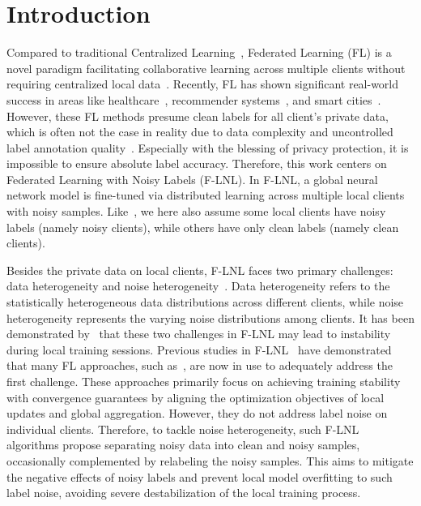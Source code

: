 \documentclass[letterpaper]{article} %
\begin{document}
\section{Introduction}
 
Compared to traditional Centralized Learning~\cite{li2019relation, li2021cross, li2019semi, wu2019mutual, wu2019enhancing, huang2023divide}, Federated Learning (FL) is a novel paradigm facilitating collaborative learning across multiple clients without requiring centralized local data~\cite{FedAvg}. Recently, FL has shown significant real-world success in areas like healthcare~\cite{healthcare1}, recommender systems~\cite{recommendation1}, and smart cities~\cite{smartcity1}. However, these FL methods presume clean labels for all client's private data, which is often not the case in reality due to data complexity and uncontrolled label annotation quality~\cite{tanno2019learning, kuznetsova2020open}. Especially with the blessing of privacy protection, it is impossible to ensure absolute label accuracy. Therefore, this work centers on Federated Learning with Noisy Labels (F-LNL). In F-LNL, a global neural network model is fine-tuned via distributed learning across multiple local clients with noisy samples. Like~\cite{xu2022fedcorr},  we here also assume some local clients have noisy labels (namely noisy clients), while others have only clean labels (namely clean clients).
 
Besides the private data on local clients, F-LNL faces two primary challenges: data heterogeneity and noise heterogeneity~\cite{kim2022fedrn,RoFL}. Data heterogeneity refers to the statistically heterogeneous data distributions across different clients, while noise heterogeneity represents the varying noise distributions among clients. It has been demonstrated by~\cite{xu2022fedcorr,kim2022fedrn} that these two challenges in F-LNL may lead to instability during local training sessions. 
Previous studies in F-LNL~\cite{xu2022fedcorr,kim2022fedrn} have demonstrated that many FL approaches, such as~\cite{FedAvg, FedProx}, are now in use to adequately address the first challenge. These approaches primarily focus on achieving training stability with convergence guarantees by aligning the optimization objectives of local updates and global aggregation. However, they do not address label noise on individual clients. Therefore, to tackle noise heterogeneity, such F-LNL algorithms propose separating noisy data into clean and noisy samples, occasionally complemented by relabeling the noisy samples. This aims to mitigate the negative effects of noisy labels and prevent local model overfitting to such label noise, avoiding severe destabilization of the local training process.
\end{document}
